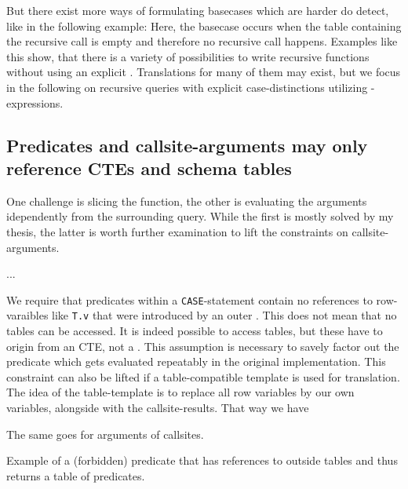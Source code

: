 But there exist more ways of formulating basecases which are harder do detect, like in the following example:
Here, the basecase occurs when the table containing the recursive call is empty and therefore no recursive call happens. Examples like this show, that there is a variety of possibilities to write recursive functions without using an explicit \CASE. Translations for many of them may exist, but we focus in the following on recursive queries with explicit case-distinctions utilizing \CASE-expressions.

\subsection{Predicates and callsite-arguments may only reference CTEs and schema tables}
One challenge is slicing the function, the other is evaluating the arguments idependently from the surrounding query. While the first is mostly solved by my thesis, the latter is worth further examination to lift the constraints on callsite-arguments.

...

We require that predicates within a \texttt{CASE}-statement contain no references to row-varaibles like \texttt{T.v} that were introduced by an outer \FROM. This does not mean that no tables can be accessed. It is indeed possible to access tables, but these have to origin from an CTE, not a \FROM. This assumption is necessary to savely factor out the predicate which gets evaluated repeatably in the original implementation. This constraint can also be lifted if a table-compatible template is used for translation. The idea of the table-template is to replace all row variables by our own variables, alongside with the callsite-results. That way we have 

The same goes for arguments of callsites.

\begin{listing}[ht]
\caption{Example of a (forbidden) predicate that has references to outside tables and thus returns a table of predicates.}
\label{lst:from_nonselfcontained}
\end{listing}